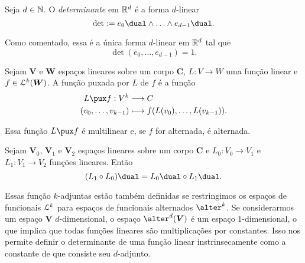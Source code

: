 \begin{defi}
Seja $d \in \mathbb{N}$. O \emph{determinante} em $\mathbb{R}^d$ é a forma $d$-linear
	\begin{equation*}
	\det := {e_0}\dual \wedge \ldots \wedge {e_{d-1}}\dual.
	\end{equation*}
\end{defi}

Como comentado, essa é a única forma $d$-linear em $\mathbb{R}^d$ tal que	\begin{equation*}
	\det(e_0,\ldots,e_{d-1})=1.
	\end{equation*}

\begin{defi}
Sejam $\bm V$ e $\bm W$ espaços lineares sobre um corpo $\bm C$, $L \colon V \to W$ uma função linear e $f \in \mathcal{L}^k(\bm W)$. A função puxada por $L$ de $f$ é a função
	\begin{align*}
	\func{L\pux f}{V^k}{C}{(v_0,\ldots,v_{k-1})}{f(L(v_0),\ldots,L(v_{k-1})).}
	\end{align*}
\end{defi}


Essa função $L\pux f$ é multilinear e, se $f$ for alternada, é alternada.

\begin{prop}
Sejam $\bm V_0$, $\bm V_1$ e $\bm V_2$ espaços lineares sobre um corpo $\bm C$ e $L_0 \colon V_0 \to V_1$ e $L_1\colon V_1 \to V_2$ funções lineares. Então
	\begin{equation*}
	(L_1 \circ L_0)\dual = {L_0}\dual \circ {L_1}\dual.
	\end{equation*}
\end{prop}

Essas função $k$-adjuntas estão também definidas se restringimos os espaços de funcionais $\mathcal{L}^k$ para espaços de funcionais alternados $\alter^k$. Se considerarmos um espaço $\bm V$ $d$-dimensional, o espaço $\alter^d(\bm V)$ é um espaço $1$-dimensional, o que implica que todas funções lineares são multiplicações por constantes. Isso nos permite definir o determinante de uma função linear instrinsecamente como a constante de que consiste seu $d$-adjunto.

